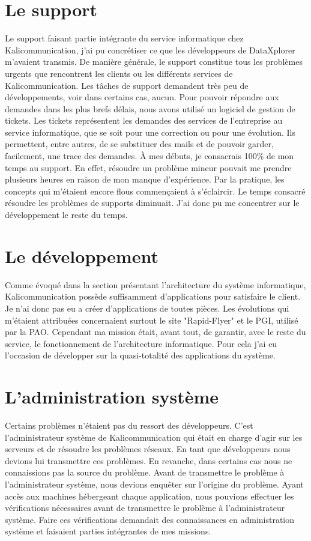 
\section{Le support}
Le support faisant partie intégrante du service informatique chez Kalicommunication, j'ai pu concrétiser ce que les développeurs de DataXplorer m'avaient transmis. De manière générale, le support constitue tous les problèmes urgents que rencontrent les clients ou les différents services de Kalicommunication. Les tâches de support demandent très peu de développements, voir dans certains cas, aucun.\newline
Pour pouvoir répondre aux demandes dans les plus brefs délais, nous avons utilisé un logiciel de gestion de tickets. Les tickets représentent les demandes des services de l'entreprise au service informatique, que se soit pour une correction ou pour une évolution. Ils permettent, entre autres, de se substituer des mails et de pouvoir garder, facilement, une trace des demandes.\newline
À mes débuts, je consacrais 100\% de mon temps au support. En effet, résoudre un problème mineur pouvait me prendre plusieurs heures en raison de mon manque d'expérience. Par la pratique, les concepts qui m'étaient encore flous commençaient à s'éclaircir. Le temps consacré résoudre les problèmes de supports diminuait. J'ai donc pu me concentrer sur le développement le reste du temps.

\section{Le développement}
Comme évoqué dans la section présentant l'architecture du système informatique, Kalicommunication possède suffisamment d'applications pour satisfaire le client. Je n'ai donc pas eu a créer d'applications de toutes pièces. Les évolutions qui m'étaient attribuées concernaient surtout le site "Rapid-Flyer" et le PGI, utilisé par la PAO. Cependant ma mission était, avant tout, de garantir, avec le reste du service, le fonctionnement de l'architecture informatique. Pour cela j'ai eu l'occasion de développer sur la quasi-totalité des applications du système.

\section{L'administration système}
Certains problèmes n'étaient pas du ressort des développeurs. C'est l'administrateur système de Kalicommunication qui était en charge d'agir sur les serveurs et de résoudre les problèmes réseaux. En tant que développeurs nous devions lui transmettre ces problèmes. En revanche, dans certains cas nous ne connaissions pas la source du problème. Avant de transmettre le problème à l'administrateur système, nous devions enquêter sur l'origine du problème. Ayant accès aux machines hébergeant chaque application, nous pouvions effectuer les vérifications nécessaires avant de transmettre le problème à l'administrateur système.\newline
Faire ces vérifications demandait des connaissances en administration système et faisaient parties intégrantes de mes missions.